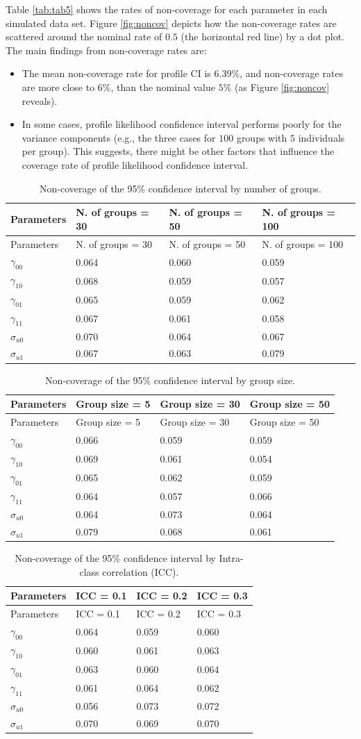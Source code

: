 \documentclass[12pt,oneside,a4paper]{reedthesis}
\providecommand{\tightlist}{%
  \setlength{\itemsep}{0pt}\setlength{\parskip}{0pt}}
\begin{document}
Table \ref{tab:tab5} shows the rates of non-coverage for each parameter in each simulated data set.
Figure \ref{fig:noncov} depicts how the non-coverage rates are scattered around the nominal rate of \(0.5\) (the horizontal red line) by a dot plot.
The main findings from non-coverage rates are:
\begin{itemize}
\tightlist
\item
  The mean non-coverage rate for profile CI is \(6.39\%\), and non-coverage rates are more close to \(6\%\), than the nominal value \(5\%\) (as Figure \ref{fig:noncov} reveals).
\item
  In some cases, profile likelihood confidence interval performs poorly for the variance components (e.g., the three cases for \(100\) groups with \(5\) individuals per group). This suggests, there might be other factors that influence the coverage rate of profile likelihood confidence interval.
\end{itemize}
\begin{longtable}[]{@{}llll@{}}
\caption{\label{tab:tab2} Non-coverage of the 95\% confidence interval by number of groups.}\tabularnewline
\toprule
Parameters & N. of groups = 30 & N. of groups = 50 & N. of groups = 100\tabularnewline
\midrule
\endfirsthead
\toprule
Parameters & N. of groups = 30 & N. of groups = 50 & N. of groups = 100\tabularnewline
\midrule
\endhead
\(\gamma_{00}\) & 0.064 & 0.060 & 0.059\tabularnewline
\(\gamma_{10}\) & 0.068 & 0.059 & 0.057\tabularnewline
\(\gamma_{01}\) & 0.065 & 0.059 & 0.062\tabularnewline
\(\gamma_{11}\) & 0.067 & 0.061 & 0.058\tabularnewline
\(\sigma_{u0}\) & 0.070 & 0.064 & 0.067\tabularnewline
\(\sigma_{u1}\) & 0.067 & 0.063 & 0.079\tabularnewline
\bottomrule
\end{longtable}
\begin{longtable}[]{@{}llll@{}}
\caption{\label{tab:tab3} Non-coverage of the 95\% confidence interval by group size.}\tabularnewline
\toprule
Parameters & Group size = 5 & Group size = 30 & Group size = 50\tabularnewline
\midrule
\endfirsthead
\toprule
Parameters & Group size = 5 & Group size = 30 & Group size = 50\tabularnewline
\midrule
\endhead
\(\gamma_{00}\) & 0.066 & 0.059 & 0.059\tabularnewline
\(\gamma_{10}\) & 0.069 & 0.061 & 0.054\tabularnewline
\(\gamma_{01}\) & 0.065 & 0.062 & 0.059\tabularnewline
\(\gamma_{11}\) & 0.064 & 0.057 & 0.066\tabularnewline
\(\sigma_{u0}\) & 0.064 & 0.073 & 0.064\tabularnewline
\(\sigma_{u1}\) & 0.079 & 0.068 & 0.061\tabularnewline
\bottomrule
\end{longtable}
\begin{longtable}[]{@{}llll@{}}
\caption{\label{tab:tab4} Non-coverage of the 95\% confidence interval by Intra-class correlation (ICC).}\tabularnewline
\toprule
Parameters & ICC = 0.1 & ICC = 0.2 & ICC = 0.3\tabularnewline
\midrule
\endfirsthead
\toprule
Parameters & ICC = 0.1 & ICC = 0.2 & ICC = 0.3\tabularnewline
\midrule
\endhead
\(\gamma_{00}\) & 0.064 & 0.059 & 0.060\tabularnewline
\(\gamma_{10}\) & 0.060 & 0.061 & 0.063\tabularnewline
\(\gamma_{01}\) & 0.063 & 0.060 & 0.064\tabularnewline
\(\gamma_{11}\) & 0.061 & 0.064 & 0.062\tabularnewline
\(\sigma_{u0}\) & 0.056 & 0.073 & 0.072\tabularnewline
\(\sigma_{u1}\) & 0.070 & 0.069 & 0.070\tabularnewline
\bottomrule
\end{longtable}
\end{document}
